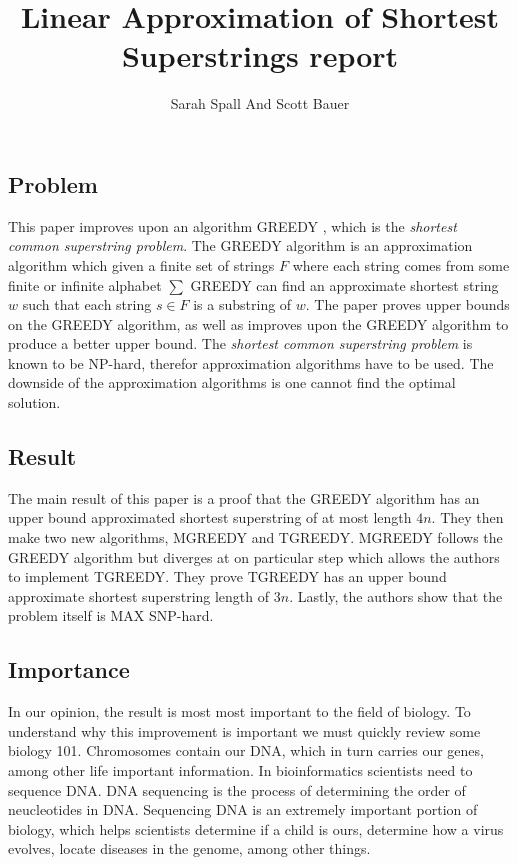 \documentclass[letterpaper,11pt,titlepage]{article}
\title{Linear Approximation of Shortest Superstrings report}
\author[1]{Sarah Spall And Scott Bauer}
\begin{document}
\maketitle
\newpage


\subsection*{Problem}

This paper improves upon an algorithm GREEDY \cite{tarhio1988greedy}, which is the \textit{shortest common superstring problem}. The GREEDY algorithm is an approximation algorithm which given a finite set of strings $F$ where each string comes from some finite or infinite alphabet $\sum$ GREEDY can find an approximate shortest string $w$ such that each string $s \in F$ is a substring of $w$. The paper proves upper bounds on the GREEDY algorithm, as well as improves upon the GREEDY algorithm to produce a better upper bound. The  \textit{shortest common superstring problem} is known to be NP-hard, therefor approximation algorithms have to be used. The downside of the approximation algorithms is one cannot find the optimal solution.  \cite{gallant1980finding}
 


\subsection*{Result}

The main result of this paper is a proof that the GREEDY algorithm has an upper bound approximated shortest superstring of at most length $4n$. They then make two new algorithms, MGREEDY and TGREEDY. MGREEDY follows the GREEDY algorithm but diverges at on particular step which allows the authors to implement TGREEDY. They prove TGREEDY has an upper bound approximate shortest superstring length of $3n$. Lastly, the authors show that the problem itself is MAX SNP-hard.

\subsection*{Importance}

In our opinion, the result is most most important to the field of biology. To understand why this improvement is important we must quickly review some biology 101. Chromosomes contain our DNA, which in turn carries our genes, among other life important information. In bioinformatics scientists need to sequence DNA. DNA sequencing is the process of determining the order of neucleotides in DNA. Sequencing DNA is an extremely important portion of biology, which helps scientists determine if a child is ours, determine how a virus evolves, locate diseases in the genome, among other things.
\end{document}
